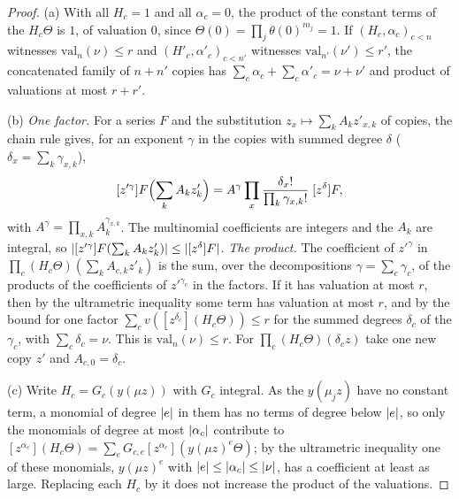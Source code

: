 \begin{proof}
(a) With all $H_c=1$ and all $\alpha_c=0$, the product of the constant terms of the $H_c\Theta$ is $1$, of valuation $0$, since $\Theta(0)=\prod_j\theta(0)^{m_j}=1$. If $(H_c,\alpha_c)_{c<n}$ witnesses $\mathrm{val}_n(\nu)\le r$ and $(H'_c,\alpha'_c)_{c<n'}$ witnesses $\mathrm{val}_{n'}(\nu')\le r'$, the concatenated family of $n+n'$ copies has $\sum_c\alpha_c+\sum_c\alpha'_c=\nu+\nu'$ and product of valuations at most $r+r'$.

(b) \emph{One factor.} For a series $F$ and the substitution $z_x\mapsto\sum_kA_kz'_{x,k}$ of copies, the chain rule gives, for an exponent $\gamma$ in the copies with summed degree $\delta$ ($\delta_x=\sum_k\gamma_{x,k}$),
\[
  [z'^\gamma]F\Bigl(\sum_kA_kz'_k\Bigr)=A^\gamma\prod_x\frac{\delta_x!}{\prod_k\gamma_{x,k}!}\;[z^\delta]F ,
\]
with $A^\gamma=\prod_{x,k}A_k^{\gamma_{x,k}}$. The multinomial coefficients are integers and the $A_k$ are integral, so $\lvert [z'^\gamma]F(\sum_kA_kz'_k)\rvert\le\lvert [z^\delta]F\rvert$. \emph{The product.} The coefficient of $z'^\gamma$ in $\prod_c(H_c\Theta)(\sum_kA_{c,k}z'_k)$ is the sum, over the decompositions $\gamma=\sum_c\gamma_c$, of the products of the coefficients of $z'^{\gamma_c}$ in the factors. If it has valuation at most $r$, then by the ultrametric inequality some term has valuation at most $r$, and by the bound for one factor $\sum_cv([z^{\delta_c}](H_c\Theta))\le r$ for the summed degrees $\delta_c$ of the $\gamma_c$, with $\sum_c\delta_c=\nu$. This is $\mathrm{val}_n(\nu)\le r$. For $\prod_c(H_c\Theta)(\delta_cz)$ take one new copy $z'$ and $A_{c,0}=\delta_c$.

(c) Write $H_c=G_c(y(\mu z))$ with $G_c$ integral. As the $y(\mu_jz)$ have no constant term, a monomial of degree $\lvert e\rvert$ in them has no terms of degree below $\lvert e\rvert$, so only the monomials of degree at most $\lvert \alpha_c\rvert$ contribute to $[z^{\alpha_c}](H_c\Theta)=\sum_eG_{c,e}[z^{\alpha_c}](y(\mu z)^e\Theta)$; by the ultrametric inequality one of these monomials, $y(\mu z)^e$ with $\lvert e\rvert\le\lvert \alpha_c\rvert\le\lvert \nu\rvert$, has a coefficient at least as large. Replacing each $H_c$ by it does not increase the product of the valuations.
\end{proof}


